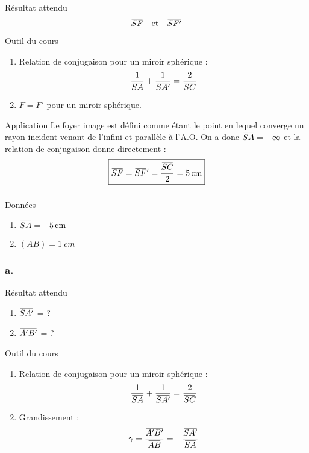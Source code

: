 \documentclass[10pt,a5paper,notitlepage]{book}
\begin{document}
\subsubsection{}
\begin{NCprop}{Résultat attendu}
    \[ \SF\quad\mathrm{et}\quad\SFp \]
\end{NCprop}

\begin{NCdemo}{Outil du cours}
    \begin{enumerate}
        \item Relation de conjugaison pour un miroir sphérique :
            \[ \frac{1}{\SA} + \frac{1}{\SAp} = \frac{2}{\SC} \]
        \item $F = F'$ pour un miroir sphérique.
    \end{enumerate}
\end{NCdemo}

\begin{NCexem}{Application}
    Le foyer image est défini comme étant le point en lequel converge un rayon
    incident venant de l'infini et parallèle à l'A.O. On a donc $\SA = +\infty$
    et la relation de conjugaison donne directement :
    \[ \boxed{\SF = \SF' = \frac{\SC}{2} = \SI{5}{cm}} \]
\end{NCexem}

\subsubsection{}
\begin{NCdefi}{Données}
    \begin{enumerate}
        \item $\SA = \SI{-5}{cm}$
        \item $(AB) = \SI{1}{cm}$
    \end{enumerate}
\end{NCdefi}

\setcounter{subsubsection}{1}
\subsubsection{a.}
\begin{NCprop}{Résultat attendu}
    \begin{enumerate}
        \item $\SAp$ = ?
        \item $\ABp$ = ?
    \end{enumerate}
\end{NCprop}

\begin{NCdemo}{Outil du cours}
    \begin{enumerate}
        \item Relation de conjugaison pour un miroir sphérique :
            \[ \frac{1}{\SA} + \frac{1}{\SAp} = \frac{2}{\SC} \]
        \item Grandissement :
            \[ \g = \frac{\ABp}{\ABb} = - \frac{\SAp}{\SA} \]
    \end{enumerate}
    
\end{NCdemo}
\end{document}
